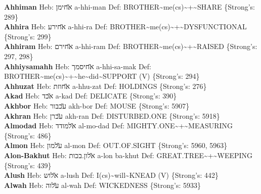 {\textbf{Ahhiman} Heb: {\large\H אחימן} a-hhi-man Def: BROTHER\textasciitilde{}me(cs)\textasciitilde{}+\textasciitilde{}SHARE \{Strong's: 289\}\hfill{}\\

\textbf{Ahhira} Heb: {\large\H אחירע} a-hhi-ra Def: BROTHER\textasciitilde{}me(cs)\textasciitilde{}+\textasciitilde{}DYSFUNCTIONAL \{Strong's: 299\}\hfill{}\\

\textbf{Ahhiram} Heb: {\large\H אחירם} a-hhi-ram Def: BROTHER\textasciitilde{}me(cs)\textasciitilde{}+\textasciitilde{}RAISED \{Strong's: 297, 298\}\hfill{}\\

\textbf{Ahhiysamahh} Heb: {\large\H אחיסמך} a-hhi-sa-mak Def: BROTHER\textasciitilde{}me(cs)\textasciitilde{}+\textasciitilde{}he\textasciitilde{}did\textasciitilde{}SUPPORT (V) \{Strong's: 294\}\hfill{}\\

\textbf{Ahhuzat} Heb: {\large\H אחוזת} a-hhu-zat Def: HOLDINGS \{Strong's: 276\}\hfill{}\\

\textbf{Akad} Heb: {\large\H אכד} a-kad Def: DELICATE \{Strong's: 390\}\hfill{}\\

\textbf{Akhbor} Heb: {\large\H עכבור} akh-bor Def: MOUSE \{Strong's: 5907\}\hfill{}\\

\textbf{Akhran} Heb: {\large\H עכרן} akh-ran Def: DISTURBED.ONE \{Strong's: 5918\}\hfill{}\\

\textbf{Almodad} Heb: {\large\H אלמודד} al-mo-dad Def: MIGHTY.ONE\textasciitilde{}+\textasciitilde{}MEASURING \{Strong's: 486\}\hfill{}\\

\textbf{Almon} Heb: {\large\H עלמון} al-mon Def: OUT.OF.SIGHT \{Strong's: 5960, 5963\}\hfill{}\\

\textbf{Alon-Bakhut} Heb: {\large\H אלון.בכות} a-lon ba-khut Def: GREAT.TREE\textasciitilde{}+\textasciitilde{}WEEPING \{Strong's: 439\}\hfill{}\\

\textbf{Alush} Heb: {\large\H אלוש} a-lush Def: I(cs)\textasciitilde{}will\textasciitilde{}KNEAD (V) \{Strong's: 442\}\hfill{}\\

\textbf{Alwah} Heb: {\large\H עלוה} al-wah Def: WICKEDNESS \{Strong's: 5933\}\hfill{}\\

}
